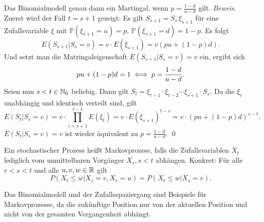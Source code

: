 \begin{lemma}
Das Binomialmodell genau dann ein Martingal, wenn $p=\frac{1-d}{u-d}$ gilt. 
\textit{Beweis}.
Zuerst wird der Fall $t = s + 1$ gezeigt:
Es gilt $S_{s+1}=S_s\,\xi_{s+1}$ für eine Zufallsvariable $\xi$ mit $\mathbb{P}(\xi_{s+1}=u)=p,\ \mathbb{P}(\xi_{s+1}=d)=1-p$. Es folgt
$$E(S_{s+1}|S_s=v)= v \cdot E(\xi_{s+1})=v(pu+(1-p)d).$$
Und setzt man die Matringaleigenschaft $E(S_{s+1}|S_s=v)=v$ ein, ergibt sich
$$pu+(1-p)d=1\\[6pt] \iff p=\frac{1-d}{u-d}.$$
Seien nun $s < t \in \Bbb N_0$ beliebig. Dann gilt $S_t=\xi_{t-1}\cdot \xi_{t-2}\cdots \xi_{s+1}\cdot S_s$. Da die $\xi_i$ unabhängig und identisch verteilt sind, gilt
$$E(S_t|S_s=v)=v \cdot \prod_{i=s+1}^{t-1} E(\xi_t)=v \cdot E(\xi_{s+1})^{t-s}=v \cdot (pu+(1-p)d)^{s-t}.$$
$E(S_t|S_s=v)=v$ ist wieder äquivalent zu $p=\frac{1-d}{u-d}$. \qed
\end{lemma}

\begin{defi}[Markovprozess]
Ein stochastischer Prozess heißt Markovprozess, falls die 
Zufallsvariablen $X_t$ lediglich vom unmittelbaren Vorgänger $X_s, s \lt t$ abhängen.
Konkret: Für alle $r \lt s \lt t$ und alle $u, v, w \in \Bbb R$ gilt
$$P(X_t \le w | X_s = v, X_r=u) = P(X_t \le w|X_s=v).$$
\end{defi}

\begin{bsp}
Das Binomialmodell und der Zufallsspaziergang sind Beispiele für Markovprozesse, da die zukünftige Position 
nur von der aktuellen Position und nicht von der gesamten Vergangenheit abhängt.
\end{bsp}